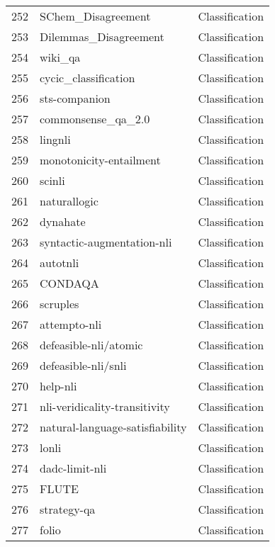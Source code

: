 \documentclass[11pt]{article}
\begin{document}
\begin{longtable}{lll}
252 & SChem\_Disagreement & Classification \\
253 & Dilemmas\_Disagreement & Classification \\
254 & wiki\_qa \citep{YangYihMeek:EMNLP2015:WikiQA} & Classification \\
255 & cycic\_classification \citep{Kejriwal2020DoFC} & Classification \\
256 & sts-companion \citep{cer-etal-2017-semeval} & Classification \\
257 & commonsense\_qa\_2.0 & Classification \\
258 & lingnli \citep{parrish-etal-2021-putting-linguist} & Classification \\
259 & monotonicity-entailment \citep{yanaka-etal-2019-neural} & Classification \\
260 & scinli \citep{sadat-caragea-2022-scinli} & Classification \\
261 & naturallogic \citep{feng2020exploring} & Classification \\
262 & dynahate \citep{vidgen2021learning} & Classification \\
263 & syntactic-augmentation-nli \citep{min-etal-2020-syntactic} & Classification \\
264 & autotnli & Classification \\
265 & CONDAQA \citep{ravichander-et-al-2022-condaqa} & Classification \\
266 & scruples & Classification \\
267 & attempto-nli & Classification \\
268 & defeasible-nli/atomic & Classification \\
269 & defeasible-nli/snli & Classification \\
270 & help-nli \citep{yanaka-EtAl:2019:starsem} & Classification \\
271 & nli-veridicality-transitivity \citep{yanaka-etal-2021-exploring} & Classification \\
272 & natural-language-satisfiability \citep{https://doi.org/10.48550/arxiv.2211.05417} & Classification \\
273 & lonli \citep{Tarunesh2021TrustingRO} & Classification \\
274 & dadc-limit-nli \citep{Wallace2022Dynamic} & Classification \\
275 & FLUTE & Classification \\
276 & strategy-qa & Classification \\
277 & folio \citep{han2022folio} & Classification \\

\end{longtable}
\end{document}
